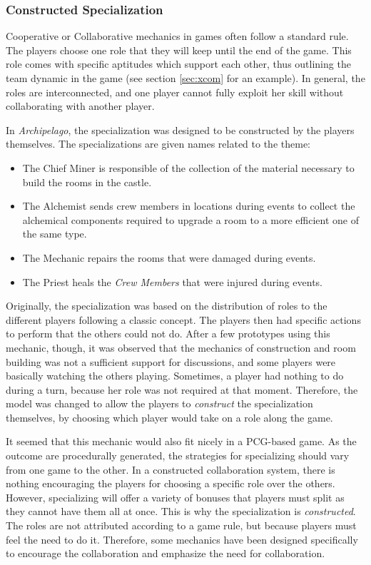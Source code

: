 \subsubsection{Constructed Specialization}
Cooperative or Collaborative mechanics in games often follow a standard rule. The players choose one role that they will keep until the end of the game. This role comes with specific aptitudes which support each other, thus outlining the team dynamic in the game (see section \ref{sec:xcom} for an example). In general, the roles are interconnected, and one player cannot fully exploit her skill without collaborating with another player.

In \textit{Archipelago}, the specialization was designed to be constructed by the players themselves. The specializations are given names related to the theme:
\begin{itemize}
\item The Chief Miner is responsible of the collection of the material necessary to build the rooms in the castle. 
\item The Alchemist sends crew members in locations during events to collect the alchemical components required to upgrade a room to a more efficient one of the same type.
\item The Mechanic repairs the rooms that were damaged during events.
\item The Priest heals the \textit{Crew Members} that were injured during events.
\end{itemize}
Originally, the specialization was based on the distribution of roles to the different players following a classic concept. The players then had specific actions to perform that the others could not do. After a few prototypes using this mechanic, though, it was observed that the mechanics of construction and room building was not a sufficient support for discussions, and some players were basically watching the others playing. Sometimes, a player had nothing to do during a turn, because her role was not required at that moment. Therefore, the model was changed to allow the players to \textit{construct} the specialization themselves, by choosing which player would take on a role along the game.

It seemed that this mechanic would also fit nicely in a PCG-based game. As the outcome are procedurally generated, the strategies for specializing should vary from one game to the other. In a constructed collaboration system, there is nothing encouraging the players for choosing a specific role over the others. However, specializing will offer a variety of bonuses that players must split as they cannot have them all at once. This is why the specialization is \textit{constructed}. The roles are not attributed according to a game rule, but because players must feel the need to do it. Therefore, some mechanics have been designed specifically to encourage the collaboration and emphasize the need for collaboration.
